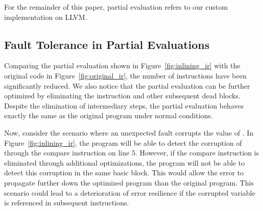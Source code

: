 For the remainder of this paper, partial evaluation refers to our custom implementation on LLVM. 


\subsection{Fault Tolerance in Partial Evaluations}

Comparing the partial evaluation shown in Figure~\ref{fig:inlining_ir} with the original code in Figure~\ref{fig:original_ir}, the number of instructions have been significantly reduced.
We also notice that the partial evaluation can be further optimized by eliminating the  instruction and other subsequent dead blocks.
Despite the elimination of intermediary steps, the partial evaluation behaves exactly the same as the original program under normal conditions. 

Now, consider the scenario where an unexpected fault corrupts the value of . 
In Figure~\ref{fig:inlining_ir}, the program will be able to detect the corruption of  through the compare instruction on line 5.
However, if the compare instruction is eliminated through additional optimizations, the program will not be able to detect this corruption in the same basic block.
This would allow the error to propagate further down the optimized program than the original program.
This scenario could lead to a deterioration of error resilience if the corrupted variable is referenced in subsequent instructions. 
